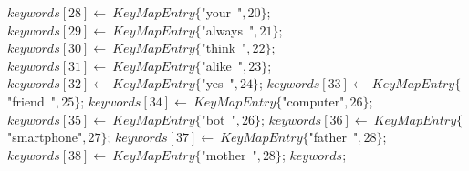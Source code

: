 \documentclass[a4paper,10pt]{article}
\begin{document}
\begin{algorithm}
\begin{algorithmic}[5]
  \STATE \(keywords[28]\gets\ KeyMapEntry\{\)"{}your\ "{}\(,20\}\);
  \STATE \(keywords[29]\gets\ KeyMapEntry\{\)"{}always\ "{}\(,21\}\);
  \STATE \(keywords[30]\gets\ KeyMapEntry\{\)"{}think\ "{}\(,22\}\);
  \STATE \(keywords[31]\gets\ KeyMapEntry\{\)"{}alike\ "{}\(,23\}\);
  \STATE \(keywords[32]\gets\ KeyMapEntry\{\)"{}yes\ "{}\(,24\}\);
  \STATE \(keywords[33]\gets\ KeyMapEntry\{\)"{}friend\ "{}\(,25\}\);
  \STATE \(keywords[34]\gets\ KeyMapEntry\{\)"{}computer"{}\(,26\}\);
  \STATE \(keywords[35]\gets\ KeyMapEntry\{\)"{}bot\ "{}\(,26\}\);
  \STATE \(keywords[36]\gets\ KeyMapEntry\{\)"{}smartphone"{}\(,27\}\);
  \STATE \(keywords[37]\gets\ KeyMapEntry\{\)"{}father\ "{}\(,28\}\);
  \STATE \(keywords[38]\gets\ KeyMapEntry\{\)"{}mother\ "{}\(,28\}\);
  \RETURN\(keywords\);

\end{algorithmic}
\end{algorithm}
\end{document}
